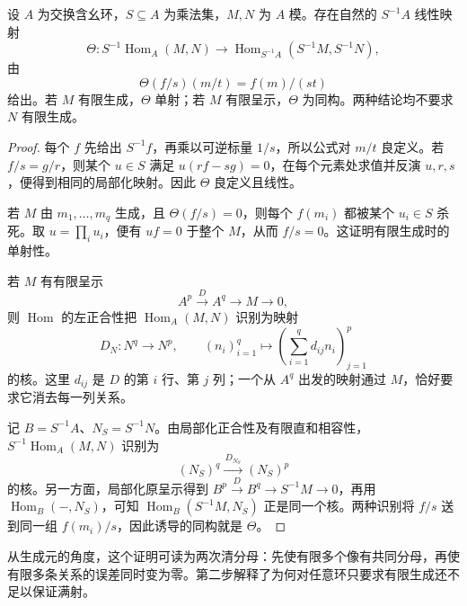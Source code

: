 \begin{proposition}\label{g5:prop:hom-localization}
	设 \(A\) 为交换含幺环，\(S\subseteq A\) 为乘法集，\(M,N\) 为 \(A\) 模。存在自然的 \(S^{-1}A\) 线性映射
	\[
		\Theta:S^{-1}\operatorname{Hom}_A(M,N)
		\longrightarrow
		\operatorname{Hom}_{S^{-1}A}(S^{-1}M,S^{-1}N),
	\]
	由
	\[
		\Theta(f/s)(m/t)=f(m)/(st)
	\]
	给出。若 \(M\) 有限生成，\(\Theta\) 单射；若 \(M\) 有限呈示，\(\Theta\) 为同构。两种结论均不要求 \(N\) 有限生成。
\end{proposition}
\begin{proof}
	每个 \(f\) 先给出 \(S^{-1}f\)，再乘以可逆标量 \(1/s\)，所以公式对 \(m/t\) 良定义。若 \(f/s=g/r\)，则某个 \(u\in S\) 满足 \(u(rf-sg)=0\)，在每个元素处求值并反演 \(u,r,s\)，便得到相同的局部化映射。因此 \(\Theta\) 良定义且线性。

	若 \(M\) 由 \(m_1,\ldots,m_q\) 生成，且 \(\Theta(f/s)=0\)，则每个 \(f(m_i)\) 都被某个 \(u_i\in S\) 杀死。取 \(u=\prod_i u_i\)，便有 \(uf=0\) 于整个 \(M\)，从而 \(f/s=0\)。这证明有限生成时的单射性。

	若 \(M\) 有有限呈示
	\[
		A^p\xrightarrow{D}A^q\longrightarrow M\longrightarrow0,
	\]
	则 \(\operatorname{Hom}\) 的左正合性把 \(\operatorname{Hom}_A(M,N)\) 识别为映射
	\[
		D_N:N^q\longrightarrow N^p,\qquad
		(n_i)_{i=1}^q\longmapsto
		\left(\sum_{i=1}^q d_{ij}n_i\right)_{j=1}^p
	\]
	的核。这里 \(d_{ij}\) 是 \(D\) 的第 \(i\) 行、第 \(j\) 列；一个从 \(A^q\) 出发的映射通过 \(M\)，恰好要求它消去每一列关系。

	记 \(B=S^{-1}A\)、\(N_S=S^{-1}N\)。由局部化正合性及有限直和相容性，\(S^{-1}\operatorname{Hom}_A(M,N)\) 识别为
	\[
		(N_S)^q\xrightarrow{\,D_{N_S}\,}(N_S)^p
	\]
	的核。另一方面，局部化原呈示得到 \(B^p\xrightarrow{D}B^q\rightarrow S^{-1}M\rightarrow0\)，再用 \(\operatorname{Hom}_B(-,N_S)\)，可知
	\(\operatorname{Hom}_B(S^{-1}M,N_S)\) 正是同一个核。两种识别将 \(f/s\) 送到同一组 \(f(m_i)/s\)，因此诱导的同构就是 \(\Theta\)。
\end{proof}

从生成元的角度，这个证明可读为两次清分母：先使有限多个像有共同分母，再使有限多条关系的误差同时变为零。第二步解释了为何对任意环只要求有限生成还不足以保证满射。

